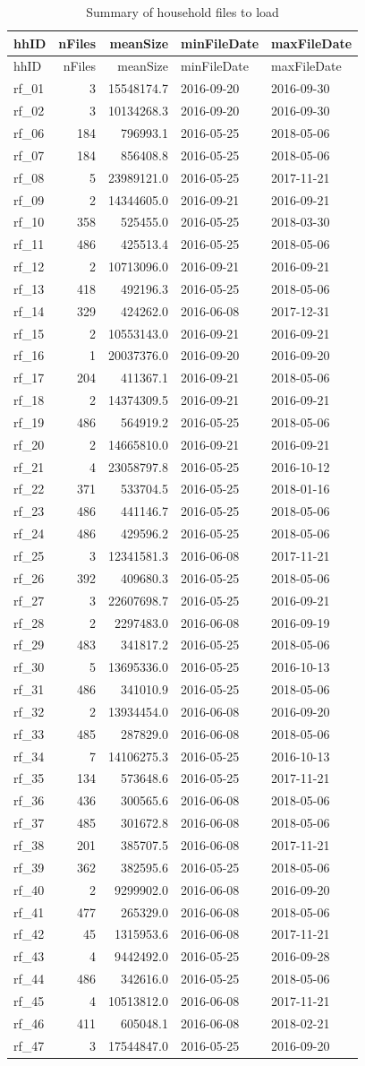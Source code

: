 \documentclass[]{article}
\begin{document}
\begin{longtable}[]{@{}lrrll@{}}
\caption{Summary of household files to load}\tabularnewline
\toprule
hhID & nFiles & meanSize & minFileDate & maxFileDate\tabularnewline
\midrule
\endfirsthead
\toprule
hhID & nFiles & meanSize & minFileDate & maxFileDate\tabularnewline
\midrule
\endhead
rf\_01 & 3 & 15548174.7 & 2016-09-20 & 2016-09-30\tabularnewline
rf\_02 & 3 & 10134268.3 & 2016-09-20 & 2016-09-30\tabularnewline
rf\_06 & 184 & 796993.1 & 2016-05-25 & 2018-05-06\tabularnewline
rf\_07 & 184 & 856408.8 & 2016-05-25 & 2018-05-06\tabularnewline
rf\_08 & 5 & 23989121.0 & 2016-05-25 & 2017-11-21\tabularnewline
rf\_09 & 2 & 14344605.0 & 2016-09-21 & 2016-09-21\tabularnewline
rf\_10 & 358 & 525455.0 & 2016-05-25 & 2018-03-30\tabularnewline
rf\_11 & 486 & 425513.4 & 2016-05-25 & 2018-05-06\tabularnewline
rf\_12 & 2 & 10713096.0 & 2016-09-21 & 2016-09-21\tabularnewline
rf\_13 & 418 & 492196.3 & 2016-05-25 & 2018-05-06\tabularnewline
rf\_14 & 329 & 424262.0 & 2016-06-08 & 2017-12-31\tabularnewline
rf\_15 & 2 & 10553143.0 & 2016-09-21 & 2016-09-21\tabularnewline
rf\_16 & 1 & 20037376.0 & 2016-09-20 & 2016-09-20\tabularnewline
rf\_17 & 204 & 411367.1 & 2016-09-21 & 2018-05-06\tabularnewline
rf\_18 & 2 & 14374309.5 & 2016-09-21 & 2016-09-21\tabularnewline
rf\_19 & 486 & 564919.2 & 2016-05-25 & 2018-05-06\tabularnewline
rf\_20 & 2 & 14665810.0 & 2016-09-21 & 2016-09-21\tabularnewline
rf\_21 & 4 & 23058797.8 & 2016-05-25 & 2016-10-12\tabularnewline
rf\_22 & 371 & 533704.5 & 2016-05-25 & 2018-01-16\tabularnewline
rf\_23 & 486 & 441146.7 & 2016-05-25 & 2018-05-06\tabularnewline
rf\_24 & 486 & 429596.2 & 2016-05-25 & 2018-05-06\tabularnewline
rf\_25 & 3 & 12341581.3 & 2016-06-08 & 2017-11-21\tabularnewline
rf\_26 & 392 & 409680.3 & 2016-05-25 & 2018-05-06\tabularnewline
rf\_27 & 3 & 22607698.7 & 2016-05-25 & 2016-09-21\tabularnewline
rf\_28 & 2 & 2297483.0 & 2016-06-08 & 2016-09-19\tabularnewline
rf\_29 & 483 & 341817.2 & 2016-05-25 & 2018-05-06\tabularnewline
rf\_30 & 5 & 13695336.0 & 2016-05-25 & 2016-10-13\tabularnewline
rf\_31 & 486 & 341010.9 & 2016-05-25 & 2018-05-06\tabularnewline
rf\_32 & 2 & 13934454.0 & 2016-06-08 & 2016-09-20\tabularnewline
rf\_33 & 485 & 287829.0 & 2016-06-08 & 2018-05-06\tabularnewline
rf\_34 & 7 & 14106275.3 & 2016-05-25 & 2016-10-13\tabularnewline
rf\_35 & 134 & 573648.6 & 2016-05-25 & 2017-11-21\tabularnewline
rf\_36 & 436 & 300565.6 & 2016-06-08 & 2018-05-06\tabularnewline
rf\_37 & 485 & 301672.8 & 2016-06-08 & 2018-05-06\tabularnewline
rf\_38 & 201 & 385707.5 & 2016-06-08 & 2017-11-21\tabularnewline
rf\_39 & 362 & 382595.6 & 2016-05-25 & 2018-05-06\tabularnewline
rf\_40 & 2 & 9299902.0 & 2016-06-08 & 2016-09-20\tabularnewline
rf\_41 & 477 & 265329.0 & 2016-06-08 & 2018-05-06\tabularnewline
rf\_42 & 45 & 1315953.6 & 2016-06-08 & 2017-11-21\tabularnewline
rf\_43 & 4 & 9442492.0 & 2016-05-25 & 2016-09-28\tabularnewline
rf\_44 & 486 & 342616.0 & 2016-05-25 & 2018-05-06\tabularnewline
rf\_45 & 4 & 10513812.0 & 2016-06-08 & 2017-11-21\tabularnewline
rf\_46 & 411 & 605048.1 & 2016-06-08 & 2018-02-21\tabularnewline
rf\_47 & 3 & 17544847.0 & 2016-05-25 & 2016-09-20\tabularnewline
\bottomrule
\end{longtable}
\end{document}
